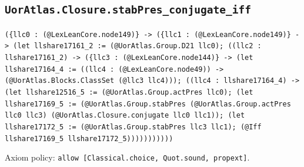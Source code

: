 \documentclass[11pt]{article}
\begin{document}
\subsection*{\texttt{UorAtlas.Closure.stabPres\_conjugate\_iff}}
\noindent\texttt{(\{llc0 : (@LexLeanCore.node149)\} -> (\{llc1 : (@LexLeanCore.node149)\} -> (let llshare17161\_2 := (@UorAtlas.Group.D21 llc0); ((llc2 : llshare17161\_2) -> (\{llc3 : (@LexLeanCore.node144)\} -> (let llshare17164\_4 := ((llc4 : (@LexLeanCore.node49)) -> (@UorAtlas.Blocks.ClassSet (@llc3 llc4))); ((llc4 : llshare17164\_4) -> (let llshare12516\_5 := (@UorAtlas.Group.actPres llc0); (let llshare17169\_5 := (@UorAtlas.Group.stabPres (@UorAtlas.Group.actPres llc0 llc3) (@UorAtlas.Closure.conjugate llc0 llc1)); (let llshare17172\_5 := (@UorAtlas.Group.stabPres llc3 llc1); (@Iff llshare17169\_5 llshare17172\_5)))))))))))}\par
\noindent Axiom policy: \texttt{allow [Classical.choice, Quot.sound, propext]}.\par
\end{document}
